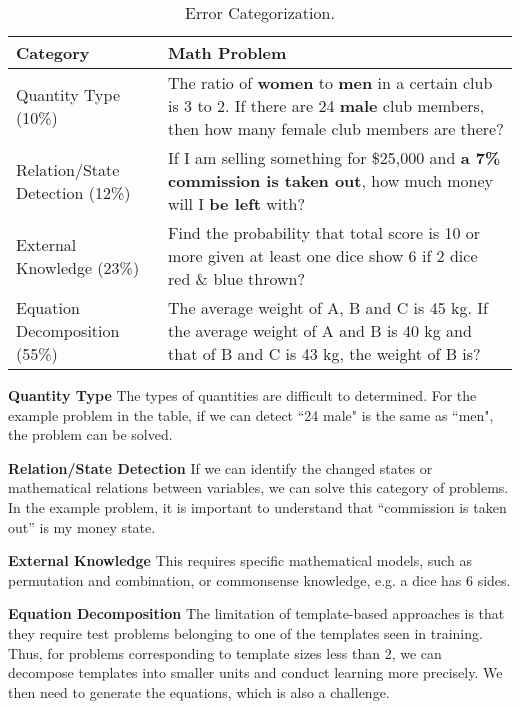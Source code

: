 \documentclass[11pt,letterpaper]{article}
\begin{document}
\begin{table}[htb]
\begin{center}
	\begin{tabular}{p{}|p{}}
        \hline
		Category & Math Problem\\
        \hline
		Quantity Type (10\%) & The ratio of \textbf{women} to \textbf{men} in a certain club is 3 to 2. If there are 24 \textbf{male} club members, then how many female club members are there? \\
        \hline
		Relation/State Detection (12\%) & If I am selling something for \$25,000 and \textbf{a 7\% commission is taken out}, how much money will I \textbf{be left} with?\\
        \hline
        External Knowledge (23\%) & Find the probability that total score is 10 or more given at least one dice show 6 if 2 dice red \& blue thrown?\\
        \hline
        Equation Decomposition (55\%) & The average weight of A, B and C is 45 kg. If the average weight of A and B is 40 kg and that of B and C is 43 kg, the weight of B is?\\
        \hline
	\end{tabular}
\end{center}
	\caption{Error Categorization.}\label{tbl:error}
\end{table}

\textbf{Quantity Type} The types of quantities are difficult to determined. For the example problem in the table, if we can detect ``24 male" is the same as ``men", the problem can be solved.

\textbf{Relation/State Detection} If we can identify the changed states or mathematical relations between variables, we can solve this category of problems. In the example problem, it is important to understand that ``commission is taken out'' is my money state.

\textbf{External Knowledge} This requires specific mathematical models, such as permutation and combination, or commonsense knowledge, e.g. a dice has 6 sides.

\textbf{Equation Decomposition} The limitation of template-based approaches is that they require test problems belonging to one of the templates seen in training. Thus, for problems corresponding to template sizes less than 2, we can decompose templates into smaller units and conduct learning more precisely. We then need to generate the equations, which is also a challenge.
\end{document}
